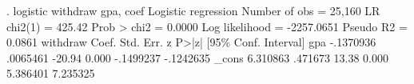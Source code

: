 . logistic withdraw gpa, coef
{\smallskip}
Logistic regression                             Number of obs     =     25,160
                                                LR chi2(1)        =     425.42
                                                Prob > chi2       =     0.0000
Log likelihood = -2257.0651                     Pseudo R2         =     0.0861
{\smallskip}
    withdraw {\VBAR}      Coef.   Std. Err.      z    P>|z|     [95\% Conf. Interval]
         gpa {\VBAR}  -.1370936   .0065461   -20.94   0.000    -.1499237   -.1242635
       _cons {\VBAR}   6.310863    .471673    13.38   0.000     5.386401    7.235325
{\smallskip}
